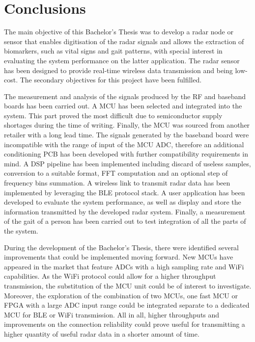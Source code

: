 \chapter{Conclusions}

The main objective of this Bachelor's Thesis was to develop a radar node or sensor that enables digitisation of the radar signals and allows the extraction of biomarkers, such as vital signs and gait patterns, with special interest in evaluating the system performance on the latter application. The radar sensor has been designed to provide real-time wireless data transmission and being low-cost. The secondary objectives for this project have been fulfilled.

The measurement and analysis of the signals produced by the RF and baseband boards has been carried out. A MCU has been selected and integrated into the system. This part proved the most difficult due to semiconductor supply shortages during the time of writing. Finally, the MCU was sourced from another retailer with a long lead time. The signals generated by the baseband board were incompatible with the range of input of the MCU ADC, therefore an additional conditioning PCB has been developed with further compatibility requirements in mind. A DSP pipeline has been implemented including discard of useless samples, conversion to a suitable format, FFT computation and an optional step of frequency bins summation. A wireless link to transmit radar data has been implemented by leveraging the BLE protocol stack. A user application has been developed to evaluate the system performance, as well as display and store the information transmitted by the developed radar system. Finally, a measurement of the gait of a person has been carried out to test integration of all the parts of the system.


During the development of the Bachelor's Thesis, there were identified several improvements that could be implemented moving forward. New MCUs have appeared in the market that feature ADCs with a high sampling rate and WiFi capabilities. As the WiFi protocol could allow for a higher throughput transmission, the substitution of the MCU unit could be of interest to investigate. Moreover, the exploration of the combination of two MCUs, one fast MCU or FPGA with a large ADC input range could be integrated separate to a dedicated MCU for BLE or WiFi transmission. All in all, higher throughputs and improvements on the connection reliability could prove useful for transmitting a higher quantity of useful radar data in a shorter amount of time.


